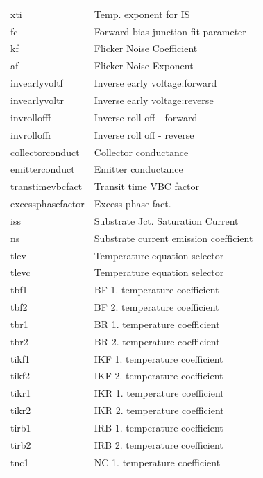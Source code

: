 \begin{longtable}{l l}
{\small xti} & {\small Temp. exponent for IS} \\
{\small fc} & {\small Forward bias junction fit parameter} \\
{\small kf} & {\small Flicker Noise Coefficient} \\
{\small af} & {\small Flicker Noise Exponent} \\
{\small invearlyvoltf} & {\small Inverse early voltage:forward} \\
{\small invearlyvoltr} & {\small Inverse early voltage:reverse} \\
{\small invrollofff} & {\small Inverse roll off - forward} \\
{\small invrolloffr} & {\small Inverse roll off - reverse} \\
{\small collectorconduct} & {\small Collector conductance} \\
{\small emitterconduct} & {\small Emitter conductance} \\
{\small transtimevbcfact} & {\small Transit time VBC factor} \\
{\small excessphasefactor} & {\small Excess phase fact.} \\
{\small iss} & {\small Substrate Jct. Saturation Current} \\
{\small ns} & {\small Substrate current emission coefficient} \\
{\small tlev} & {\small Temperature equation selector} \\
{\small tlevc} & {\small Temperature equation selector} \\
{\small tbf1} & {\small BF 1. temperature coefficient} \\
{\small tbf2} & {\small BF 2. temperature coefficient} \\
{\small tbr1} & {\small BR 1. temperature coefficient} \\
{\small tbr2} & {\small BR 2. temperature coefficient} \\
{\small tikf1} & {\small IKF 1. temperature coefficient} \\
{\small tikf2} & {\small IKF 2. temperature coefficient} \\
{\small tikr1} & {\small IKR 1. temperature coefficient} \\
{\small tikr2} & {\small IKR 2. temperature coefficient} \\
{\small tirb1} & {\small IRB 1. temperature coefficient} \\
{\small tirb2} & {\small IRB 2. temperature coefficient} \\
{\small tnc1} & {\small NC 1. temperature coefficient} \\

\end{longtable}
